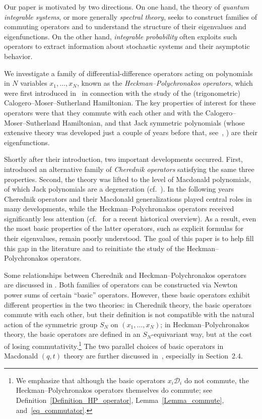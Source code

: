 \documentclass[11pt]{article}
\theoremstyle{definition}
\numberwithin{equation}{section}
\newcommand{\D}{\mathcal D}
\begin{document}
Our paper is motivated by two directions. On one hand, the theory of \emph{quantum integrable systems}, or more generally \emph{spectral theory}, seeks to construct families of commuting operators and to understand the structure of their eigenvalues and eigenfunctions. On the other hand, \emph{integrable probability} often exploits such operators to extract information about stochastic systems and their asymptotic behavior.

We investigate a family of differential-difference operators acting on polynomials in $N$ variables $x_1,\dots,x_N$, known as the \emph{Heckman--Polychronakos operators}, which were first introduced in~\cite{heckman1991elementary,polychronakos1992exchange} in connection with the study of the (trigonometric) Calogero--Moser--Sutherland Hamiltonian. The key properties of interest for these operators were that they commute with each other and with the Calogero--Moser--Sutherland Hamiltonian, and that Jack symmetric polynomials (whose extensive theory was developed just a couple of years before that, see~\cite{stanley1989some}, \cite[Chapter VI]{macdonald1998symmetric}) are their eigenfunctions.


Shortly after their introduction, two important developments occurred. First,~\cite{cherednik1991unification,cherednik1994integration} introduced an alternative family of \emph{Cherednik operators} satisfying the same three properties. Second, the theory was lifted to the level of Macdonald polynomials, of which Jack polynomials are a degeneration (cf.\ \cite[Chapter 6]{macdonald1998symmetric}). In the following years Cherednik operators and their Macdonald generalizations played central roles in many developments, while the Heckman--Polychronakos operators received significantly less attention (cf.~\cite{chalykh2024dunkl} for a recent historical overview). As a result, even the most basic properties of the latter operators, such as explicit formulas for their eigenvalues, remain poorly understood. The goal of this paper is to help fill this gap in the literature and to reinitiate the study of the Heckman--Polychronakos operators.


Some relationships between Cherednik and Heckman--Polychronakos operators are discussed in \cite[Section 5]{sergeev2015jack}. Both families of operators can be constructed via Newton power sums of certain ``basic'' operators. However, these basic operators exhibit different properties in the two theories: in Cherednik theory, the basic operators commute with each other, but their definition is not compatible with the natural action of the symmetric group $S_N$ on $(x_1, \dots, x_N)$; in Heckman--Polychronakos theory, the basic operators are defined in an $S_N$-equivariant way, but at the cost of losing commutativity.\footnote{We emphasize that although the basic operators $x_i\D_i$ do not commute, the Heckman--Polychronakos operators themselves do commute; see Definition~\ref{Definition_HP_operator}, Lemma~\ref{Lemma_commute}, and~\eqref{eq_commutator}.} The two parallel choices of basic operators in Macdonald $(q,t)$ theory are further discussed in~\cite{nazarov2019cherednik}, especially in Section~2.4.
\end{document}
